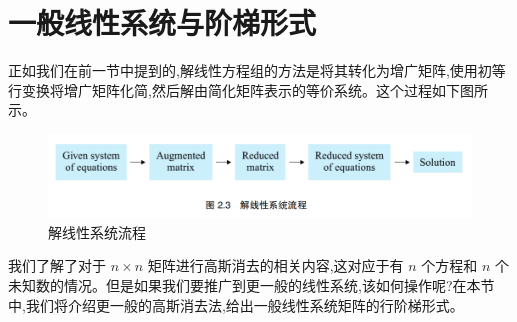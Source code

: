 \newcommand{\circlednum}[1]{%
    \tikz[baseline=(char.base)]{%
        \node[draw, circle, inner sep=1pt] (char) {#1};%
    }%
}

\section{一般线性系统与阶梯形式}
正如我们在前一节中提到的,解线性方程组的方法是将其转化为增广矩阵,使用初等行变换将增广矩阵化简,然后解由简化矩阵表示的等价系统。这个过程如下图所示。

\begin{figure}[h]
    \centering
    \includegraphics[width=\linewidth]{../images/2.1-1.png} %
    \caption{解线性系统流程}
    \label{fig:linear_system_process}
\end{figure}

我们了解了对于 \(n \times n\) 矩阵进行高斯消去的相关内容,这对应于有 \(n\) 个方程和 \(n\) 个未知数的情况。但是如果我们要推广到更一般的线性系统,该如何操作呢?在本节中,我们将介绍更一般的高斯消去法,给出一般线性系统矩阵的行阶梯形式。

